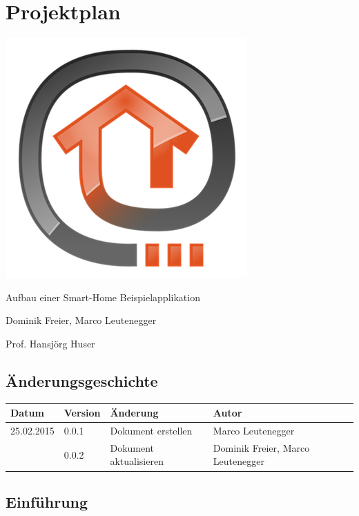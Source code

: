 \chapter{Projektplan}

\begin{center}
	\includegraphics[scale=0.75]{appendix/img/openhabLogo}
\end{center}
\vfill
\begin{description}[style=multiline,leftmargin=3cm]
\item[Thema] Aufbau einer Smart-Home Beispielapplikation
\item[Studenten] Dominik Freier, Marco Leutenegger
\item[Betreuer] Prof. Hansjörg Huser
\end{description}
\pagebreak

\section*{Änderungsgeschichte}
	\begin{tabularx}{\textwidth}{lllX}
	\textbf{Datum}		& \textbf{Version}	& \textbf{Änderung}	& \textbf{Autor} \\
	\hline
	25.02.2015			& 0.0.1				& Dokument erstellen & Marco Leutenegger \\
	\hline
	\tbd					& 0.0.2				& Dokument aktualisieren	& Dominik Freier, Marco Leutenegger \\
	\hline
	\end{tabularx}
\pagebreak

\section*{Einführung}
